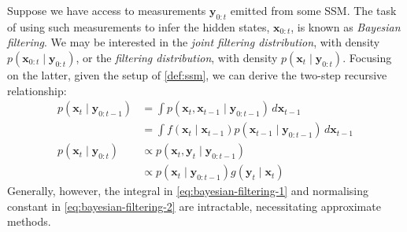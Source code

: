 \begin{definition} \label{def:bayesian-filtering}
    Suppose we have access to measurements $\mathbf{y}_{0:t}$ emitted from some
    SSM. The task of using such measurements to infer the hidden states, $\mathbf{x}_{0:t}$, is
    known as \emph{Bayesian filtering}. We may be interested in the
    \emph{joint filtering distribution}, with density $p(\mathbf{x}_{0:t} \mid \mathbf{y}_{0:t})$,
    or the \emph{filtering distribution}, with density $p(\mathbf{x}_t \mid \mathbf{y}_{0:t})$.
    Focusing on the latter, given the setup of \ref{def:ssm}, we can derive the two-step recursive
    relationship:
    \begin{align}
        p(\mathbf{x}_t \mid \mathbf{y}_{0:t-1}) &= \int p(\mathbf{x}_t, \mathbf{x}_{t-1} \mid \mathbf{y}_{0:t-1})\, d\mathbf{x}_{t-1} \nonumber \\
        &= \int f(\mathbf{x}_t \mid \mathbf{x}_{t - 1})p(\mathbf{x}_{t-1} \mid \mathbf{y}_{0:t-1})\, d\mathbf{x}_{t-1} \label{eq:bayesian-filtering-1} \\
        p(\mathbf{x}_t \mid \mathbf{y}_{0:t}) &\propto p(\mathbf{x}_t, \mathbf{y}_t \mid \mathbf{y}_{0:t-1}) \nonumber \\
        &\propto p(\mathbf{x}_t \mid \mathbf{y}_{0:t-1})g(\mathbf{y}_t \mid \mathbf{x}_t) \label{eq:bayesian-filtering-2}
    \end{align}
    Generally, however, the integral in \ref{eq:bayesian-filtering-1} and normalising constant in
    \ref{eq:bayesian-filtering-2} are intractable, necessitating approximate methods.
\end{definition}

